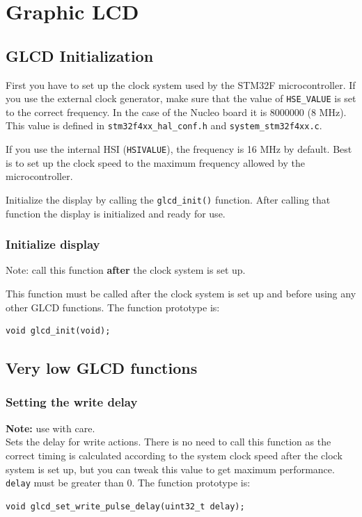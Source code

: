 \documentclass[12pt]{article}
\newcommand{\ifunc}[1]{\index{\texttt{#1}}}
\begin{document}
\section{Graphic LCD}
\subsection{GLCD Initialization}
First you have to set up the clock system used by the STM32F microcontroller. If you use the external clock generator, make sure that the value of \lstinline|HSE_VALUE| is set to the correct frequency. In the case of the Nucleo board it is 8000000 (8 MHz). This value is defined in \lstinline|stm32f4xx_hal_conf.h| and \lstinline|system_stm32f4xx.c|.

If you use the internal HSI (\lstinline|HSIVALUE|), the frequency is 16 MHz by default. Best is to set up the clock speed to the maximum frequency allowed by the microcontroller.

Initialize the display by calling the \lstinline|glcd_init()| function. After calling that function the display is initialized and ready for use.

\subsubsection{Initialize display}
Note: call this function \textbf{after} the clock system is set up.

This function must be called after the clock system is set up and before using any other GLCD functions. The function prototype is:
\begin{lstlisting}
void glcd_init(void);
\end{lstlisting}

\subsection{Very low GLCD functions}

\subsubsection{Setting the write delay}
\ifunc{glcd\_set\_write\_pulse\_delay}
\textbf{Note:} use with care.\\
Sets the delay for write actions. There is no need to call this function as the correct timing is calculated according to the system clock speed after the clock system is set up, but you can tweak this value to get maximum performance. \lstinline|delay| must be greater than 0. The function prototype is:
\begin{lstlisting}
void glcd_set_write_pulse_delay(uint32_t delay);
\end{lstlisting}
\end{document}
